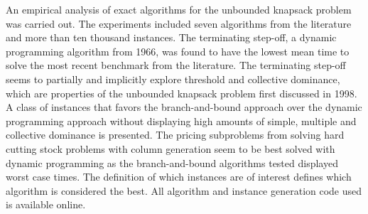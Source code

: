 An empirical analysis of exact algorithms for the unbounded knapsack problem was carried out.
The experiments included seven algorithms from the literature and more than ten thousand instances.
The terminating step-off, a dynamic programming algorithm from 1966, was found to have the lowest mean time to solve the most recent benchmark from the literature.
The terminating step-off seems to partially and implicitly explore threshold and collective dominance, which are properties of the unbounded knapsack problem first discussed in 1998.
A class of instances that favors the branch-and-bound approach over the dynamic programming approach without displaying high amounts of simple, multiple and collective dominance is presented.
The pricing subproblems from solving hard cutting stock problems with column generation seem to be best solved with dynamic programming as the branch-and-bound algorithms tested displayed worst case times.
The definition of which instances are of interest defines which algorithm is considered the best.
All algorithm and instance generation code used is available online.

